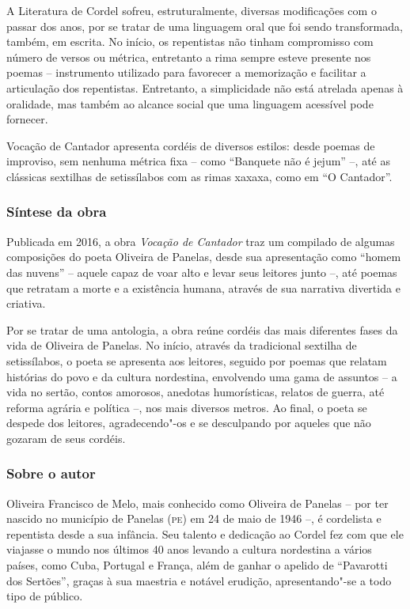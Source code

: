 \documentclass[12pt]{extarticle}
\begin{document}
A Literatura de Cordel sofreu, estruturalmente, diversas modificações
com o passar dos anos, por se tratar de uma linguagem oral que foi sendo
transformada, também, em escrita. No início, os repentistas não tinham
compromisso com número de versos ou métrica, entretanto a rima sempre
esteve presente nos poemas -- instrumento utilizado para favorecer a
memorização e facilitar a articulação dos repentistas. Entretanto, a
simplicidade não está atrelada apenas à oralidade, mas também ao alcance
social que uma linguagem acessível pode fornecer.

Vocação de Cantador apresenta cordéis de diversos estilos: desde poemas
de improviso, sem nenhuma métrica fixa -- como ``Banquete não é jejum''
--, até as clássicas sextilhas de setissílabos com as rimas xaxaxa, como
em ``O Cantador''.

\subsubsection{Síntese da obra}

Publicada em 2016, a obra \emph{Vocação de Cantador} traz um compilado
de algumas composições do poeta Oliveira de Panelas, desde sua
apresentação como ``homem das nuvens'' -- aquele capaz de voar alto e
levar seus leitores junto --, até poemas que retratam a morte e a
existência humana, através de sua narrativa divertida e criativa.

Por se tratar de uma antologia, a obra reúne cordéis das mais diferentes
fases da vida de Oliveira de Panelas. No início, através da tradicional
sextilha de setissílabos, o poeta se apresenta aos leitores, seguido por
poemas que relatam histórias do povo e da cultura nordestina, envolvendo
uma gama de assuntos -- a vida no sertão, contos amorosos, anedotas
humorísticas, relatos de guerra, até reforma agrária e política --, nos
mais diversos metros. Ao final, o poeta se despede dos leitores,
agradecendo"-os e se desculpando por aqueles que não gozaram de seus
cordéis.

\subsubsection{Sobre o autor}

Oliveira Francisco de Melo, mais conhecido como Oliveira de Panelas --
por ter nascido no município de Panelas (\textsc{pe}) em 24 de maio de 1946 --, é
cordelista e repentista desde a sua infância. Seu talento e dedicação ao
Cordel fez com que ele viajasse o mundo nos últimos 40 anos levando a
cultura nordestina a vários países, como Cuba, Portugal e França, além
de ganhar o apelido de ``Pavarotti dos Sertões'', graças à sua maestria
e notável erudição, apresentando"-se a todo tipo de público.
\end{document}
